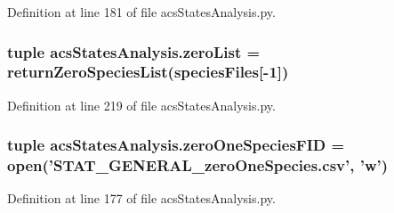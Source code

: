 Definition at line 181 of file acs\-States\-Analysis.\-py.

\hypertarget{a00099_ac2f9e6ead14745bd749a1ab8060cd4e7}{
\subsubsection[{zero\-List}]{\setlength{\rightskip}{0pt plus 5cm}tuple acs\-States\-Analysis.\-zero\-List = {\bf return\-Zero\-Species\-List}({\bf species\-Files}\mbox{[}-\/1\mbox{]})}}\label{a00099_ac2f9e6ead14745bd749a1ab8060cd4e7}


Definition at line 219 of file acs\-States\-Analysis.\-py.

\hypertarget{a00099_a3dc90aca8a97c5995b013887c98d8ce9}{
\subsubsection[{zero\-One\-Species\-F\-I\-D}]{\setlength{\rightskip}{0pt plus 5cm}tuple acs\-States\-Analysis.\-zero\-One\-Species\-F\-I\-D = open('S\-T\-A\-T\-\_\-\-G\-E\-N\-E\-R\-A\-L\-\_\-zero\-One\-Species.\-csv', 'w')}}\label{a00099_a3dc90aca8a97c5995b013887c98d8ce9}


Definition at line 177 of file acs\-States\-Analysis.\-py.

